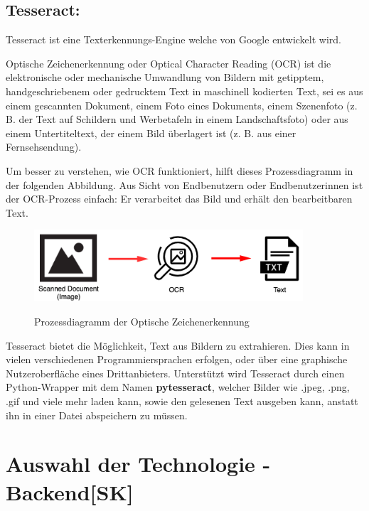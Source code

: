  \subsection{Tesseract: } Tesseract ist eine Texterkennungs-Engine welche von Google entwickelt wird. 

 Optische Zeichenerkennung oder Optical Character Reading (OCR) ist die elektronische oder mechanische Umwandlung von Bildern mit getipptem, handgeschriebenem oder gedrucktem Text in maschinell kodierten Text, sei es aus einem gescannten Dokument, einem Foto eines Dokuments, einem Szenenfoto (z. B. der Text auf Schildern und Werbetafeln in einem Landschaftsfoto) oder aus einem Untertiteltext, der einem Bild überlagert ist (z. B. aus einer Fernsehsendung).
 \cite{ocrWiki}

Um besser zu verstehen, wie OCR funktioniert, hilft dieses Prozessdiagramm in der folgenden Abbildung. Aus Sicht von Endbenutzern oder Endbenutzerinnen ist der OCR-Prozess einfach: Er verarbeitet das Bild und erhält den bearbeitbaren Text.
\begin{figure}[H]
  \centering
  \includegraphics[width=10cm]{pics/OCR-Prozessdiagramm.png}
  \caption{Prozessdiagramm der Optische Zeichenerkennung}
  \cite{introToTesseract}
\end{figure}
 Tesseract bietet die Möglichkeit, Text aus Bildern zu extrahieren. Dies kann in vielen verschiedenen Programmiersprachen erfolgen, oder über eine graphische Nutzeroberfläche eines Drittanbieters.\cite{AboutTesseract} Unterstützt wird Tesseract durch einen Python-Wrapper mit dem Namen \textbf{pytesseract}, welcher Bilder wie .jpeg, .png, .gif und viele mehr laden kann, sowie den gelesenen Text ausgeben kann, anstatt ihn in einer Datei abspeichern zu müssen.\cite{AboutPyTesseract}
 
\section{Auswahl der Technologie - Backend[SK]}
